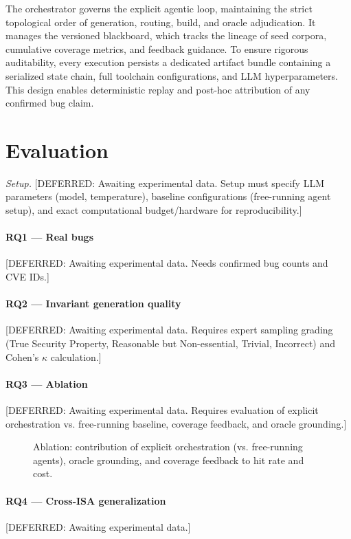\documentclass[conference]{IEEEtran}
\newcommand{\figplaceholder}[2]{%
  \begin{figure}[t]\centering
  \setlength{\fboxsep}{10pt}%
  \fbox{\parbox[c][2.2cm][c]{0.86\columnwidth}{\centering
    \textbf{[FIGURE PLACEHOLDER]}\\[3pt]\small\ttfamily #1}}%
  \caption{#2}\label{fig:#1}
  \end{figure}%
}
\begin{document}
The orchestrator governs the explicit agentic loop, maintaining the strict topological order of generation, routing, build, and oracle adjudication. It manages the versioned blackboard, which tracks the lineage of seed corpora, cumulative coverage metrics, and feedback guidance. To ensure rigorous auditability, every execution persists a dedicated artifact bundle containing a serialized state chain, full toolchain configurations, and LLM hyperparameters. This design enables deterministic replay and post-hoc attribution of any confirmed bug claim.

\section{Evaluation}\label{sec:eval}
\emph{Setup.} [DEFERRED: Awaiting experimental data. Setup must specify LLM parameters (model, temperature), baseline configurations (free-running agent setup), and exact computational budget/hardware for reproducibility.]

\paragraph{RQ1 --- Real bugs} [DEFERRED: Awaiting experimental data. Needs confirmed bug counts and CVE IDs.]

\paragraph{RQ2 --- Invariant generation quality} [DEFERRED: Awaiting experimental data. Requires expert sampling grading (True Security Property, Reasonable but Non-essential, Trivial, Incorrect) and Cohen's $\kappa$ calculation.]

\paragraph{RQ3 --- Ablation} [DEFERRED: Awaiting experimental data. Requires evaluation of explicit orchestration vs. free-running baseline, coverage feedback, and oracle grounding.]
\figplaceholder{ablation}{Ablation: contribution of explicit orchestration (vs. free-running agents), oracle grounding, and coverage feedback to hit rate and cost.}

\paragraph{RQ4 --- Cross-ISA generalization} [DEFERRED: Awaiting experimental data.]
\end{document}
